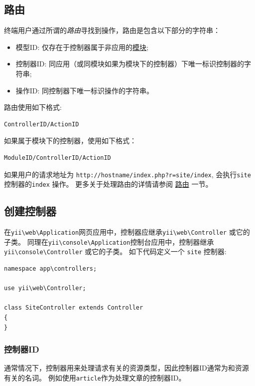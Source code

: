 \subsection{路由 \label{structure-controllers.md::routes}}
终端用户通过所谓的\textit{路由}寻找到操作，路由是包含以下部分的字符串：

\begin{itemize}
\item 模型ID: 仅存在于控制器属于非应用的\hyperref[structure-modules.md]{模块};
\item 控制器ID: 同应用（或同模块如果为模块下的控制器）下唯一标识控制器的字符串;
\item 操作ID: 同控制器下唯一标识操作的字符串。
\end{itemize}
路由使用如下格式:

\begin{lstlisting}
ControllerID/ActionID
\end{lstlisting}
如果属于模块下的控制器，使用如下格式：

\lstset{language=php}\begin{lstlisting}
ModuleID/ControllerID/ActionID
\end{lstlisting}
如果用户的请求地址为 \lstinline|http://hostname/index.php?r=site/index|, 会执行\lstinline|site| 控制器的\lstinline|index| 操作。
更多关于处理路由的详情请参阅 \hyperref[runtime-routing.md]{路由} 一节。

\subsection{创建控制器 \label{structure-controllers.md::creating-controllers}}
在\texttt{yii{\allowbreak{}\textbackslash}web{\allowbreak{}\textbackslash}Application}网页应用中，控制器应继承\texttt{yii{\allowbreak{}\textbackslash}web{\allowbreak{}\textbackslash}Controller} 或它的子类。
同理在\texttt{yii{\allowbreak{}\textbackslash}console{\allowbreak{}\textbackslash}Application}控制台应用中，控制器继承\texttt{yii{\allowbreak{}\textbackslash}console{\allowbreak{}\textbackslash}Controller} 或它的子类。
如下代码定义一个 \lstinline|site| 控制器:

\lstset{language=php}\begin{lstlisting}
namespace app\controllers;

use yii\web\Controller;

class SiteController extends Controller
{
}
\end{lstlisting}
\subsubsection{控制器ID \label{structure-controllers.md::controller-ids}}
通常情况下，控制器用来处理请求有关的资源类型，因此控制器ID通常为和资源有关的名词。
例如使用\lstinline|article|作为处理文章的控制器ID。

